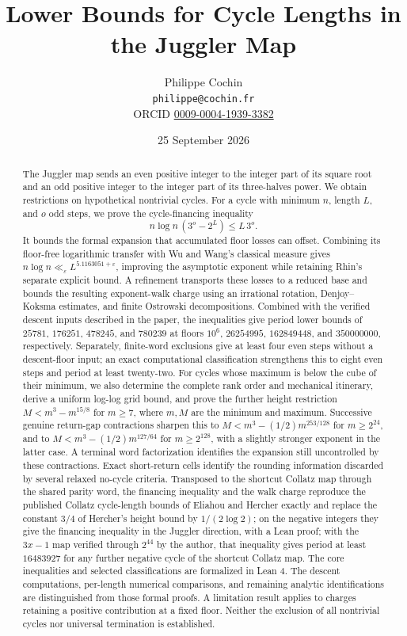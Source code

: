 \documentclass[12pt]{article}
\title{Lower Bounds for Cycle Lengths in the Juggler Map}
\author{Philippe Cochin \\ \texttt{philippe@cochin.fr} \\
  \small ORCID \href{https://orcid.org/0009-0004-1939-3382}{0009-0004-1939-3382}}
\date{25 September 2026}
\begin{document}
\maketitle
\begin{abstract}

The Juggler map sends an even positive integer to the integer part of
its square root and an odd positive integer to the integer part of its
three-halves power. We obtain restrictions on hypothetical nontrivial
cycles. For a cycle with minimum \(n\), length \(L\), and \(o\) odd
steps, we prove the cycle-financing inequality \[
n\log n\,(3^o-2^L)\le L\,3^o.
\] It bounds the formal expansion that accumulated floor losses can
offset. Combining its floor-free logarithmic transfer with Wu and Wang's
classical measure gives
\(n\log n\ll_\varepsilon L^{5.1163051+\varepsilon}\), improving the
asymptotic exponent while retaining Rhin's separate explicit bound. A
refinement transports these losses to a reduced base and bounds the
resulting exponent-walk charge using an irrational rotation,
Denjoy--Koksma estimates, and finite Ostrowski decompositions. Combined
with the verified descent inputs described in the paper, the
inequalities give period lower bounds of \(25781\), \(176251\),
\(478245\), and \(780239\) at floors \(10^6\), \(26254995\),
\(162849448\), and \(350000000\), respectively. Separately, finite-word
exclusions give at least four even steps without a descent-floor input;
an exact computational classification strengthens this to eight even
steps and period at least twenty-two. For cycles whose maximum is below
the cube of their minimum, we also determine the complete rank order and
mechanical itinerary, derive a uniform log-log grid bound, and prove the
further height restriction \(M<m^3-m^{15/8}\) for \(m\ge7\), where
\(m,M\) are the minimum and maximum. Successive genuine return-gap
contractions sharpen this to \(M<m^3-(1/2)m^{253/128}\) for
\(m\ge2^{24}\), and to \(M<m^3-(1/2)m^{127/64}\) for \(m\ge2^{128}\),
with a slightly stronger exponent in the latter case. A terminal word
factorization identifies the expansion still uncontrolled by these
contractions. Exact short-return cells identify the rounding information
discarded by several relaxed no-cycle criteria. Transposed to the
shortcut Collatz map through the shared parity word, the financing
inequality and the walk charge reproduce the published Collatz
cycle-length bounds of Eliahou and Hercher exactly and replace the
constant \(3/4\) of Hercher's height bound by \(1/(2\log 2)\); on the
negative integers they give the financing inequality in the Juggler
direction, with a Lean proof; with the \(3x-1\) map verified through
\(2^{44}\) by the author, that inequality gives period at least
\(16483927\) for any further negative cycle of the shortcut Collatz map.
The core inequalities and selected classifications are formalized in
Lean 4. The descent computations, per-length numerical comparisons, and
remaining analytic identifications are distinguished from those formal
proofs. A limitation result applies to charges retaining a positive
contribution at a fixed floor. Neither the exclusion of all nontrivial
cycles nor universal termination is established.

\end{abstract}
\end{document}
